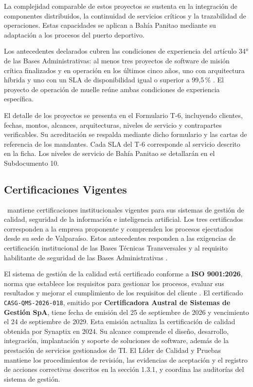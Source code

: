 La complejidad comparable de estos proyectos se sustenta en la
integración de componentes distribuidos, la continuidad de servicios
críticos y la trazabilidad de operaciones. Estas capacidades se
aplican a Bahía Panitao mediante su adaptación a los procesos
del puerto deportivo.

Los antecedentes declarados cubren las condiciones de experiencia
del artículo 34° de las Bases Administrativas: al menos tres
proyectos de software de misión crítica finalizados y en operación
en los últimos cinco años, uno con arquitectura híbrida y uno con
un SLA de disponibilidad igual o superior a 99,5\,\% \parencite[art.~34.1, p.~22]{bases-admin}. El proyecto
de operación de muelle reúne ambas condiciones de experiencia
específica.

El detalle de los proyectos se presenta en el Formulario T-6,
incluyendo clientes, fechas, montos, alcances, arquitecturas,
niveles de servicio y contrapartes verificables. Su acreditación
se respalda mediante dicho formulario y las cartas de referencia
de los mandantes. Cada SLA del T-6 corresponde al servicio descrito
en la ficha. Los niveles de servicio de Bahía Panitao se detallarán
en el Subdocumento 10.

\subsection{Certificaciones Vigentes}

\RazonSocial\ mantiene certificaciones institucionales vigentes para sus sistemas de gestión de calidad, seguridad de la información e inteligencia artificial. Los tres certificados corresponden a la empresa proponente y comprenden los procesos ejecutados desde su sede de Valparaíso. Estos antecedentes responden a las exigencias de certificación institucional de las Bases Técnicas Transversales y al requisito habilitante de seguridad de las Bases Administrativas \parencites[sec.~15.2, p.~28]{bases-transversales}[art.~34.1, p.~22]{bases-admin}.

El sistema de gestión de la calidad está certificado conforme a \textbf{ISO 9001:2026}, norma que establece los requisitos para gestionar los procesos, evaluar sus resultados y mejorar el cumplimiento de los requisitos del cliente \parencite{iso9001}. El certificado \texttt{CASG-QMS-2026-018}, emitido por \textbf{Certificadora Austral de Sistemas de Gestión SpA}, tiene fecha de emisión del 25 de septiembre de 2026 y vencimiento el 24 de septiembre de 2029. Esta emisión actualiza la certificación de calidad obtenida por Synaptix en 2024. Su alcance comprende el diseño, desarrollo, integración, implantación y soporte de soluciones de software, además de la prestación de servicios gestionados de TI. El Líder de Calidad y Pruebas mantiene los procedimientos de revisión, las evidencias de aceptación y el registro de acciones correctivas descritos en la sección 1.3.1, y coordina las auditorías del sistema de gestión.

